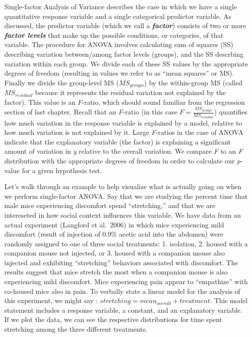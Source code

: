 \documentclass[]{book}
\begin{document}
Single-factor Analysis of Variance describes the case in which we have a single quantitative response variable and a single categorical predictor variable. As discussed, the predictor variable (which we call a \textbf{\emph{factor}}) consists of two or more \textbf{\emph{factor levels}} that make up the possible conditions, or categories, of that variable. The procedure for ANOVA involves calculating sum of squares (SS) describing variation between/among factor levels (groups), and the SS descrbing variation within each group. We divide each of these SS values by the appropriate degrees of freedom (resulting in values we refer to as ``mean squares'' or MS). Finally we divide the group-level MS (\(MS_{groups}\)) by the within-group MS (called \(MS_{residual}\) because it represents the residual variation not explained by the factor). This value is an \emph{F}-ratio, which should sound familiar from the regression section of last chapter. Recall that an \emph{F}-ratio (in this case \(F=\frac{MS_{groups}}{MS_{residual}}\)) quantifies how much variation in the response variable is explained by a model, relative to how much variation is not explained by it. Large \emph{F}-ratios in the case of ANOVA indicate that the explanatory variable (the factor) is explaining a significant amount of variation in \emph{y} relative to the overall variation. We compare \emph{F} to an \emph{F} distribution with the appropriate degrees of freedom in order to calculate our \emph{p}-value for a given hypothesis test.

Let's walk through an example to help visualize what is actually going on when we perform single-factor ANOVA. Say that we are studying the percent time that male mice experiencing discomfort spend ``stretching,'' and that we are intereseted in how social context influences this variable. We have data from an actual experiment (Langford et al.~2006) in which mice experiencing mild discomfort (result of injection of 0.9\% acetic acid into the abdomen) were randomly assigned to one of three social treatments: 1. isolation, 2. housed with a companion mouse not injected, or 3. housed with a companion mouse also injected and exhibiting ``stretching'' behaviors associated with discomfort. The results suggest that mice stretch the most when a companion mouse is also experiencing mild discomfort. Mice experiencing pain appear to ``empathize'' with co-housed mice also in pain. To verbally state a linear model for the analysis of this experiment, we might say : \(stretching=mean_{overall}+treatment\). This model statement includes a response variable, a constant, and an explanatory variable. If we plot the data, we can see the respective distributions for time spent stretching among the three different treatments.
\end{document}
